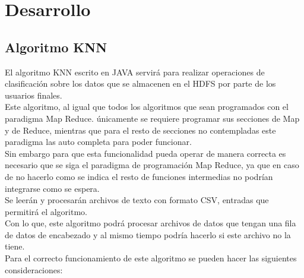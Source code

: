 \section{Desarrollo}
\subsection{Algoritmo KNN}
El algoritmo KNN escrito en JAVA servirá para realizar operaciones de clasificación sobre los datos que se almacenen en el HDFS por parte de los usuarios finales.
\\
Este algoritmo, al igual que todos los algoritmos que sean programados con el paradigma Map Reduce. únicamente se requiere programar sus secciones de Map y de Reduce, mientras que para el resto de secciones no contempladas este paradigma las auto completa para poder funcionar.
\\
Sin embargo para que esta funcionalidad pueda operar de manera correcta es necesario que se siga el paradigma de programación Map Reduce, ya que en caso de no hacerlo como se indica el resto de funciones intermedias no podrían integrarse como se espera.
\\
Se leerán y procesarán archivos de texto con formato CSV, entradas que permitirá el algoritmo. 
\\
Con lo que, este algoritmo podrá procesar archivos de datos que tengan una fila de datos de encabezado y al mismo tiempo podría hacerlo si este archivo no la tiene. \\
Para el correcto funcionamiento de este algoritmo se pueden hacer las siguientes consideraciones: 
